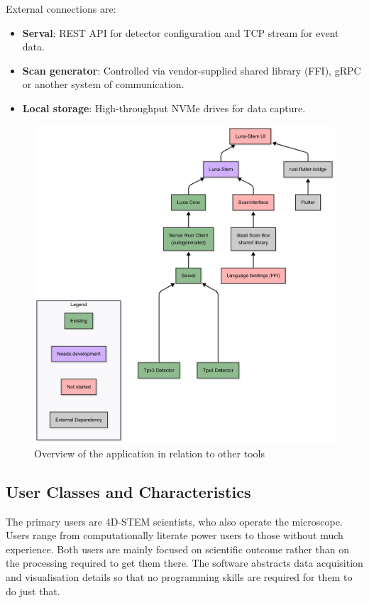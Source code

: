 \documentclass[10pt]{article}
\begin{document}
    External connections are:
    \begin{itemize}
        \item \textbf{Serval}: REST API for detector configuration and TCP stream for event data.
        \item \textbf{Scan generator}: Controlled via vendor-supplied shared library (FFI), gRPC or another system of communication.
        \item \textbf{Local storage}: High-throughput NVMe drives for data capture.
    \end{itemize}

    \begin{figure}[t]
        \centering
        \includegraphics[width=0.7\linewidth]{GeneralStructure}
        \caption{Overview of the application in relation to other tools}
        \label{fig:general_structure}
    \end{figure}

    \subsection{User Classes and Characteristics}\label{subsec:user-classes-and-characteristics}
    The primary users are 4D-STEM scientists, who also operate the microscope. Users range from computationally literate power users to those without much experience. Both users are mainly focused on scientific outcome rather than on the processing required to get them there. The software abstracts data acquisition and visualisation details so that no programming skills are required for them to do just that.
\end{document}

